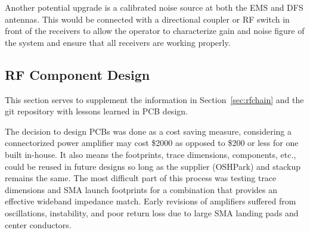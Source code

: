 \documentclass[titlepage]{article}
\begin{document}
Another potential upgrade is a calibrated noise source at both the EMS and DFS antennas. This would be connected with a directional coupler or RF switch in front of the receivers to allow the operator to characterize gain and noise figure of the system and ensure that all receivers are working properly.

\subsection{RF Component Design}
This section serves to supplement the information in Section~\ref{sec:rfchain} and the git repository with lessons learned in PCB design.

The decision to design PCBs was done as a cost saving measure, considering a connectorized power amplifier may cost \$2000 as opposed to \$200 or less for one built in-house. It also means the footprints, trace dimensions, components, etc., could be reused in future designs so long as the supplier (OSHPark) and stackup remains the same. The most difficult part of this process was testing trace dimensions and SMA launch footprints for a combination that provides an effective wideband impedance match. Early revisions of amplifiers suffered from oscillations, instability, and poor return loss due to large SMA landing pads and center conductors.
\end{document}
